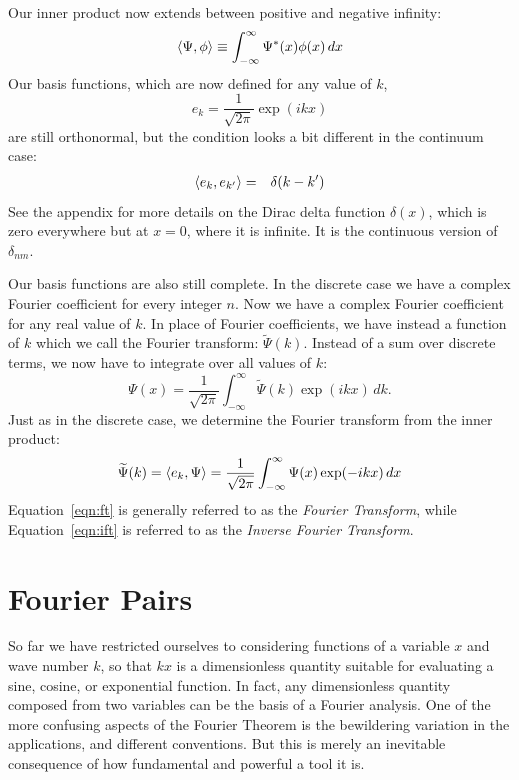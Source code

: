 \documentclass[12pt,oneside]{book}
\begin{document}
Our inner product now extends between positive and negative infinity:
\begin{equation}
\braket{\Psi, \phi} \equiv \int_{-\infty}^{\infty} \Psi^*(x) \phi(x) \, dx
\end{equation}
Our basis functions, which are now defined for any value of $k$,
\begin{equation}
e_k = \frac{1}{\sqrt{2\pi}} \exp(i k x)
\end{equation}
are still orthonormal, but the condition looks a bit different in the continuum case:
\begin{eqnarray*}
\braket{e_k, e_{k'}} &=& \delta(k-k')
\end{eqnarray*}
See the appendix for more details on the Dirac delta function $\delta(x)$, which is zero everywhere but at $x=0$, where it is infinite.  It is the continuous version of $\delta_{nm}$.

Our basis functions are also still complete.  In the discrete case we have a complex Fourier coefficient for every integer $n$.   Now we have a complex Fourier coefficient for any real value of $k$.  In place of Fourier coefficients, we have instead a function of $k$ which we call the Fourier transform: $\widetilde{\Psi}(k)$.
Instead of a sum over discrete terms, we now have to integrate over all values of $k$:
\begin{equation} \label{eqn:ift}
\Psi(x) = \frac{1}{\sqrt{2\pi}} \int_{-\infty}^{\infty} \widetilde{\Psi}(k) \exp(ikx) \, dk.
\end{equation}
Just as in the discrete case, we determine the Fourier transform from the inner product:
\begin{equation} \label{eqn:ft}
\widetilde{\Psi}(k) = \braket{e_k, \Psi} = \frac{1}{\sqrt{2\pi}} \int_{-\infty}^{\infty} {\Psi}(x) \exp(-ikx) \, dx
\end{equation}
Equation~\ref{eqn:ft} is generally referred to as the {\em Fourier Transform}, while Equation~\ref{eqn:ift} is referred to as the {\em Inverse Fourier Transform}.

\section{Fourier Pairs}

So far we have restricted ourselves to considering functions of a variable $x$ and wave number $k$, so that $k x$ is a dimensionless quantity suitable for evaluating a sine, cosine, or exponential function.
In fact, any dimensionless quantity composed from two variables can be the basis of a Fourier analysis.
One of the more confusing aspects of the Fourier Theorem is the bewildering variation in the applications, and different conventions.   But this is merely an inevitable consequence of how fundamental and powerful a tool it is.  
\end{document}

